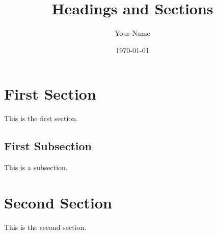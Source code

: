 \documentclass{article}
\title{Headings and Sections}
\author{Your Name}
\date{\today}
\begin{document}
\maketitle

\section{First Section}
This is the first section.

\subsection{First Subsection}
This is a subsection.

\section{Second Section}
This is the second section.
\end{document}
